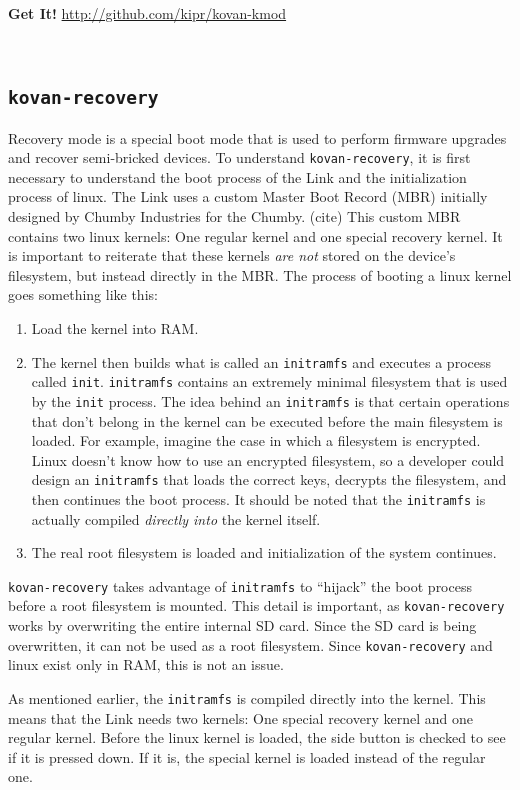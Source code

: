 \documentclass[12pt,letterpaper]{article}
\newcommand{\bcolorbox}[4]{\noindent \\ \fcolorbox{#1}{#2} {\parbox{\textwidth}{\vspace{.1em}\textbf{#3} #4\vspace{.1em}}} \\}
\newcommand{\getit}[1]{\bcolorbox{Indigo}{Lavender}{Get It!}{#1}}
\begin{document}
	\getit{\url{http://github.com/kipr/kovan-kmod}}
	\subsection{\texttt{kovan-recovery}}
	Recovery mode is a special boot mode that is used to perform firmware upgrades and recover semi-bricked devices.
	To understand  \texttt{kovan-recovery}, it is first necessary to understand the boot process of the Link and the initialization process of linux.
	The Link uses a custom Master Boot Record (MBR) initially designed by Chumby Industries for the Chumby. (cite) This custom MBR
	contains two linux kernels: One regular kernel and one special recovery kernel. It is important to reiterate that these kernels \emph{are not} 
	stored on the device's filesystem, but instead directly in the MBR. The process of booting a linux kernel goes something like this:
	\begin{enumerate}
		\item Load the kernel into RAM.
		\item The kernel then builds what is called an \texttt{initramfs} and executes a process called \texttt{init}. \texttt{initramfs} contains
		an extremely minimal filesystem that is used by the \texttt{init} process. The idea behind an \texttt{initramfs} is that certain operations
		that don't belong in the kernel can be executed before the main filesystem is loaded. For example, imagine the case in which a filesystem
		is encrypted. Linux doesn't know how to use an encrypted filesystem, so a developer could design an \texttt{initramfs} that loads the
		correct keys, decrypts the filesystem, and then continues the boot process. It should be noted that the \texttt{initramfs} is actually
		compiled \emph{directly into} the kernel itself.
		\item The real root filesystem is loaded and initialization of the system continues.
	\end{enumerate}
	
	\texttt{kovan-recovery} takes advantage of \texttt{initramfs} to ``hijack'' the boot process before a root filesystem is mounted. This detail is
	important, as \texttt{kovan-recovery} works by overwriting the entire internal SD card. Since the SD card is being overwritten, it can not be used
	as a root filesystem. Since \texttt{kovan-recovery} and linux exist only in RAM, this is not an issue.
	
	As mentioned earlier, the \texttt{initramfs} is compiled directly into the kernel. This means that the Link needs two kernels: One special
	recovery kernel and one regular kernel. Before the linux kernel is loaded, the side button is checked to see if it is pressed down. If it is,
	the special kernel is loaded instead of the regular one.
	
\end{document}
